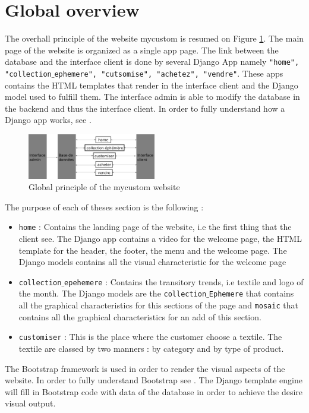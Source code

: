 \section{Global overview}

The overhall principle of the website mycustom is resumed on Figure \ref{fig:principe}. The main page of the website is organized as a single app page. The link between the database and the interface client is done by several Django App namely \texttt{"home", "collection$\_$ephemere", "cutsomise", "achetez", "vendre"}. These apps contains the HTML templates that render in the interface client and the Django model used to fulfill them. The interface admin is able to modify the database in the backend and thus the interface client. In order to fully understand how a Django app works, see \cite{Django}. 

\begin{figure}[!ht]
	\centering
	\includegraphics[width=0.5\textwidth]{Intro/principe}
	\caption{Global principle of the mycustom website}
	\label{fig:principe}
\end{figure}

The purpose of each of theses section is the following : 

\begin{itemize}
	\item \texttt{home} : Contains the landing page of the website, i.e the first thing that the client see. The Django app contains a video for the welcome page, the HTML template for the header, the footer, the menu and the welcome page. The Django models contains all the visual characteristic for the welcome page
	\item \texttt{collection$\_$epehemere} : Contains the transitory trends, i.e textile and logo of the month. The Django models are the \texttt{collection$\_$Ephemere} that contains all the graphical characteristics for this sections of the page and \texttt{mosaic} that contains all the graphical characteristics for an add of this section.
	\item \texttt{customiser} : This is the place where the customer choose a textile. The textile are classed by two manners : by category and by type of product. 
\end{itemize}

The Bootstrap framework is used in order to render the visual aspects of the website. In order to fully understand Bootstrap see \cite{Bootstrap}. The Django template engine will fill in Bootstrap code with data of the database in order to achieve the desire visual output. 
